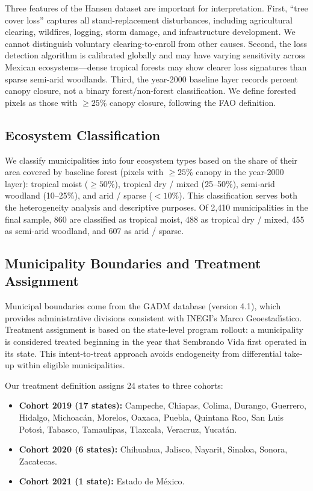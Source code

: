 \documentclass[12pt]{article}
\begin{document}
Three features of the Hansen dataset are important for interpretation. First, ``tree cover loss'' captures all stand-replacement disturbances, including agricultural clearing, wildfires, logging, storm damage, and infrastructure development. We cannot distinguish voluntary clearing-to-enroll from other causes. Second, the loss detection algorithm is calibrated globally and may have varying sensitivity across Mexican ecosystems---dense tropical forests may show clearer loss signatures than sparse semi-arid woodlands. Third, the year-2000 baseline layer records percent canopy closure, not a binary forest/non-forest classification. We define forested pixels as those with $\geq 25\%$ canopy closure, following the FAO definition.

\subsection{Ecosystem Classification}

We classify municipalities into four ecosystem types based on the share of their area covered by baseline forest (pixels with $\geq 25\%$ canopy in the year-2000 layer): tropical moist ($\geq 50\%$), tropical dry / mixed (25--50\%), semi-arid woodland (10--25\%), and arid / sparse ($< 10\%$). This classification serves both the heterogeneity analysis and descriptive purposes. Of 2,410 municipalities in the final sample, 860 are classified as tropical moist, 488 as tropical dry / mixed, 455 as semi-arid woodland, and 607 as arid / sparse.

\subsection{Municipality Boundaries and Treatment Assignment}

Municipal boundaries come from the GADM database (version 4.1), which provides administrative divisions consistent with INEGI's Marco Geoestad\'{\i}stico. Treatment assignment is based on the state-level program rollout: a municipality is considered treated beginning in the year that Sembrando Vida first operated in its state. This intent-to-treat approach avoids endogeneity from differential take-up within eligible municipalities.

Our treatment definition assigns 24 states to three cohorts:
\begin{itemize}
  \item \textbf{Cohort 2019 (17 states):} Campeche, Chiapas, Colima, Durango, Guerrero, Hidalgo, Michoac\'{a}n, Morelos, Oaxaca, Puebla, Quintana Roo, San Luis Potos\'{\i}, Tabasco, Tamaulipas, Tlaxcala, Veracruz, Yucat\'{a}n.
  \item \textbf{Cohort 2020 (6 states):} Chihuahua, Jalisco, Nayarit, Sinaloa, Sonora, Zacatecas.
  \item \textbf{Cohort 2021 (1 state):} Estado de M\'{e}xico.
\end{itemize}
\end{document}
